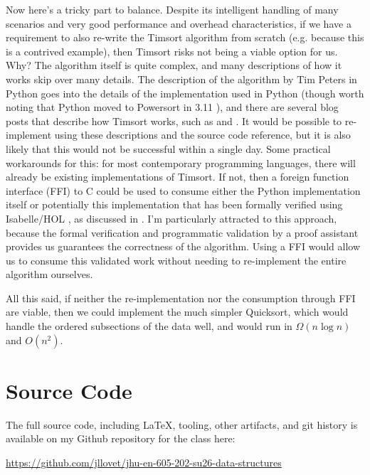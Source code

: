 \documentclass[10pt,letterpaper,final]{report}
\begin{document}
Now here's a tricky part to balance. Despite its intelligent handling of many scenarios and very good performance and overhead characteristics, if we have a requirement to also re-write the Timsort algorithm from scratch (e.g. because this is a contrived example), then Timsort risks not being a viable option for us. Why? The algorithm itself is quite complex, and many descriptions of how it works skip over many details. The description of the algorithm by Tim Peters \parencite{GitHubCpythonObjectslistsorttxtAtMain} in Python goes into the details of the implementation used in Python \parencite{GitHubCpythonObjectslistobjectcAtMain} (though worth noting that Python moved to Powersort in 3.11 \parencite{JamesPythonNowUsesPowersort}), and there are several blog posts that describe how Timsort works, such as \parencite{Timsortmd} and \parencite{AWDESH2018Timsort}. It would be possible to re-implement using these descriptions and the source code reference, but it is also likely that this would not be successful within a single day. Some practical workarounds for this: for most contemporary programming languages, there will already be existing implementations of Timsort. If not, then a foreign function interface (FFI) \parencite{EnwikipediaorgForeignFunctionInterface} to C could be used to consume either the Python implementation itself \parencite{GitHubCpythonObjectslistobjectcAtMain} or potentially this implementation that has been formally verified using Isabelle/HOL \parencite{GitHubGitHubLVPGroupTimSort} \parencite{TobiasNipkowLawrencePaulsonMakariusWenzelGerwinKleinFlorianHaftmannTjarkWeberJohannesHlzlOverview}, as discussed in \parencite{ArXivorgVerifiedTimsortC}. I'm particularly attracted to this approach, because the formal verification and programmatic validation by a proof assistant provides us guarantees the correctness of the algorithm. Using a FFI would allow us to consume this validated work without needing to re-implement the entire algorithm ourselves.

All this said, if neither the re-implementation nor the consumption through FFI are viable, then we could implement the much simpler Quicksort, which would handle the ordered subsections of the data well, and would run in $\Omega(n \log n)$ and $O(n^2)$. \parencite{LaforeEtAl2019DataStructuresAndAlgorithmsInPython}

\pagebreak

\section*{Source Code}
The full source code, including LaTeX, tooling, other artifacts, and git history is available on my Github repository for the class here:
\begin{center}
  \url{https://github.com/jllovet/jhu-en-605-202-su26-data-structures}
\end{center}

\printbibliography
\end{document}
